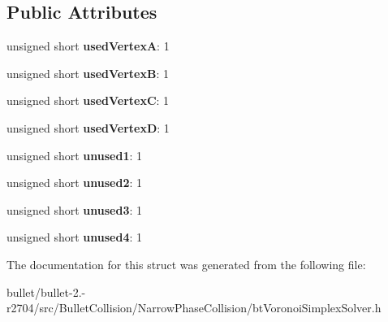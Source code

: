 \subsection*{Public Attributes}
\begin{DoxyCompactItemize}
\item 
\hypertarget{structbt_usage_bitfield_a89f4e3bfb8f8c5d25aed05509b7009f8}{unsigned short {\bfseries used\+Vertex\+A}\+: 1}\label{structbt_usage_bitfield_a89f4e3bfb8f8c5d25aed05509b7009f8}

\item 
\hypertarget{structbt_usage_bitfield_a2cb57078f8cc12563e203943d2ff9410}{unsigned short {\bfseries used\+Vertex\+B}\+: 1}\label{structbt_usage_bitfield_a2cb57078f8cc12563e203943d2ff9410}

\item 
\hypertarget{structbt_usage_bitfield_a043b60da708ba0bc2afa2b8fb42c6258}{unsigned short {\bfseries used\+Vertex\+C}\+: 1}\label{structbt_usage_bitfield_a043b60da708ba0bc2afa2b8fb42c6258}

\item 
\hypertarget{structbt_usage_bitfield_aee95f13a3e9ed4e8dce9e4e10ffb1a41}{unsigned short {\bfseries used\+Vertex\+D}\+: 1}\label{structbt_usage_bitfield_aee95f13a3e9ed4e8dce9e4e10ffb1a41}

\item 
\hypertarget{structbt_usage_bitfield_aadbb6e9c0d36c63655e4737819e70d88}{unsigned short {\bfseries unused1}\+: 1}\label{structbt_usage_bitfield_aadbb6e9c0d36c63655e4737819e70d88}

\item 
\hypertarget{structbt_usage_bitfield_ad3b32bf8a67c2292de05a607217177fb}{unsigned short {\bfseries unused2}\+: 1}\label{structbt_usage_bitfield_ad3b32bf8a67c2292de05a607217177fb}

\item 
\hypertarget{structbt_usage_bitfield_ab801bb6d791973098ff4d135fa553726}{unsigned short {\bfseries unused3}\+: 1}\label{structbt_usage_bitfield_ab801bb6d791973098ff4d135fa553726}

\item 
\hypertarget{structbt_usage_bitfield_a2fccd8b7050cdd1fd0792eae3cf89878}{unsigned short {\bfseries unused4}\+: 1}\label{structbt_usage_bitfield_a2fccd8b7050cdd1fd0792eae3cf89878}

\end{DoxyCompactItemize}


The documentation for this struct was generated from the following file\+:\begin{DoxyCompactItemize}
\item 
bullet/bullet-\/2.-\/r2704/src/\+Bullet\+Collision/\+Narrow\+Phase\+Collision/bt\+Voronoi\+Simplex\+Solver.\+h\end{DoxyCompactItemize}
